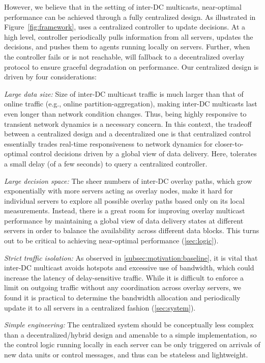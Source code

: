 However, we believe that in the setting of inter-DC multicasts, near-optimal performance can be achieved through a fully centralized design. As illustrated in Figure~\ref{fig:framework}, \name uses a centralized controller to update decisions. At a high level, \name controller periodically pulls information from all servers, updates the decisions, and pushes them to agents running locally on servers. Further, when the controller fails or is not reachable, \name will fallback to a decentralized overlay protocol to ensure graceful degradation on performance.
Our centralized design is driven by four considerations:
\begin{packedenumerate}
\item {\em Large data size:}
Size of inter-DC multicast traffic is much larger than that of online traffic (e.g., online partition-aggregation), making inter-DC multicasts last even longer than network condition changes. Thus, being highly responsive to transient network dynamics is a necessary concern. In this context, the tradeoff between a centralized design and a decentralized one is that centralized control essentially trades real-time responsiveness to network dynamics for closer-to-optimal control decisions driven by a global view of data delivery. Here, \name tolerates a small delay (of a few seconds) to query a centralized controller.

\item {\em Large decision space:}
The sheer numbers of inter-DC overlay paths,
which grow exponentially with more servers acting as overlay nodes,
make it hard for individual servers to explore all possible overlay
paths based only on its local measurements.
Instead, there is a great room for improving overlay multicast
performance by maintaining a global view of data delivery states at
different servers in order to balance the availability across
different data blocks. This turns out to be critical to achieving near-optimal performance (\Section\ref{sec:logic}).
\item {\em Strict traffic isolation:}
As observed in \Section\ref{subsec:motivation:baseline}, it is vital that inter-DC
multicast avoids hotspots and excessive use of
bandwidth, which could increase the latency of delay-sensitive traffic.
While it is difficult to enforce a limit on outgoing traffic
without any coordination across overlay servers, we found it is practical
to determine the bandwidth allocation and periodically update it
to all servers in a centralized fashion (\Section\ref{sec:system}).
\item {\em Simple engineering:}
The centralized system should be conceptually less complex than a decentralized/hybrid design and amenable to a simple implementation, so the control logic running locally in each server can be only triggered on arrivals of new data units or control messages, and thus can be stateless and lightweight.

\end{packedenumerate}

